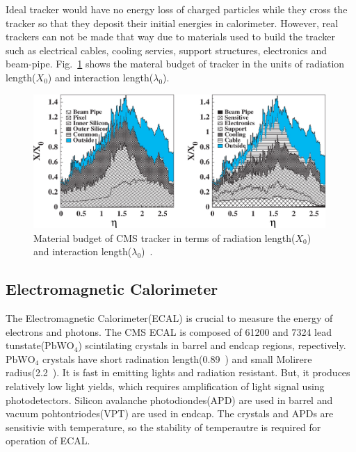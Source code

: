 Ideal tracker would have no energy loss of charged particles 
while they cross the tracker so that they deposit their initial 
energies in calorimeter. However, real trackers can not be made 
that way due to materials used to build the tracker such as 
electrical cables, cooling servies, support structures, 
electronics and beam-pipe. Fig.~\ref{fig:trackermaterial} shows 
the materal budget of tracker in the units of radiation length($X_0$) 
and interaction length($\lambda_0$). 
%
\begin{figure}[ht!] 
\vspace{1cm}
\centering 
\includegraphics[width=0.99\textwidth]{figures/trackermaterial.jpeg}
\caption{Material budget of CMS tracker in terms of radiation length($X_0$)
and interaction length($\lambda_0$)~\cite{Abbaneo2004331}.} 
\label{fig:trackermaterial} 
\end{figure} 



\subsection{Electromagnetic Calorimeter} 

The Electromagnetic Calorimeter(ECAL) is crucial to measure the energy 
of electrons and photons. The CMS ECAL is composed of 61200 and 7324 
lead tunstate($\textrm{PbWO}_4$) scintilating crystals in barrel and 
endcap regions, repectively. $\textrm{PbWO}_4$ crystals have short 
radination length(0.89~\cm) and small Molirere radius(2.2~\cm). 
It is fast in emitting lights and radiation resistant. 
But, it produces relatively low light yields, which requires amplification 
of light signal using photodetectors. Silicon avalanche photodiondes(APD)
are used in barrel and vacuum pohtontriodes(VPT) are used in endcap.
The crystals and APDs are sensitivie with temperature, so the stability
of temperautre is required for operation of ECAL. 

